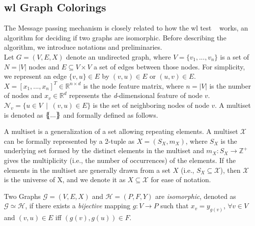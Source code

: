 \subsection{\acl*{wl} Graph Colorings}
\label{sec:related:character:wl}
The Message passing mechanism is closely related to how the \acf{wl} test ~\cite{Weisfeiler1968,Damke2020,Huang2022} works, an algorithm for deciding if two graphs are isomorphic.
Before describing the algorithm, we introduce notations and preliminaries.\\
Let $G = (V,E, X)$ denote an undirected graph, where $V =\{v_{1},...,v_{n}\}$ is a set of $ N = |V|$ nodes and $E \subseteq V\times V $ a set of edges between those nodes. For simplicity, we represent an edge $\{v,u\} \in E$ by $(v,u) \in E$ or $(u,v)\in E$. $X= [x_{1},...,x_{n}]^{T} \in \mathbb{R}^{n \times d}$ is the node feature matrix, where $n = |V|$ is the number of nodes and $x_{v} \in \mathbb{R}^{d}$ represents the \textit{d}-dimensional feature of node $v$. $\mathcal{N}_{v}= \{u \in V\ \mid \ (v,u) \in E\}$ is the set of neighboring nodes of node $v$. A multiset is denoted
as $\ldblbrace...\rdblbrace$ and formally defined as follows.
\begin{defn}[Multiset]
    A multiset is a generalization of a set allowing repeating elements.
    A multiset $\mathcal{X}$ can be formally represented by a 2-tuple as $X = (S_{X}, m_{X})$, where $S_{X}$ is the
    underlying set formed by the distinct elements in the multiset and $m_{X}:S_{X} \rightarrow
        \mathbb{Z}^{+}$ gives the multiplicity (i.e., the number of occurrences) of the elements.
    If the elements in the multiset are generally drawn from a set $X$ (i.e., $S_{X} \subseteq \mathcal{X}$), then $\mathcal{X}$ is the universe of X, and we denote it as $X \subseteq \mathcal{X}$ for ease of notation.
\end{defn}
\begin{defn}[Isomorphism]
    Two Graphs $\mathcal{G}= (V,E,X)$ and $\mathcal{H}= (P,F,Y)$ are \textit{isomorphic}, denoted as $\mathcal{G} \simeq \mathcal{H}$, if there exists a \textit{bijective} mapping $g: V \rightarrow P$ such that $x_{v}= y_{g(v)}$, $\forall v \in V$ and $(v,u) \in E$ iff $(g(v),g(u)) \in F$.
\end{defn}
